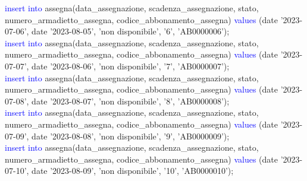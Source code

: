 \documentclass{article}
\begin{document}
\begin{flushleft}
{        \vspace{2mm}
        \hspace*{0.5em}\textcolor{blue}{insert into} assegna(data\_assegnazione, scadenza\_assegnazione, stato, \hspace*{0.5em}numero\_armadietto\_assegna, codice\_abbonamento\_assegna) \textcolor{blue}{values} \hspace*{0.5em}(date \hspace*{0.5em}'2023-07-06', date '2023-08-05', 'non disponibile', '6', 'AB0000006'); \\
        \vspace{2mm}
        \hspace*{0.5em}\textcolor{blue}{insert into} assegna(data\_assegnazione, scadenza\_assegnazione, stato, \hspace*{0.5em}numero\_armadietto\_assegna, codice\_abbonamento\_assegna) \textcolor{blue}{values} \hspace*{0.5em}(date \hspace*{0.5em}'2023-07-07', date '2023-08-06', 'non disponibile', '7', 'AB0000007'); \\
        \vspace{2mm}
        \hspace*{0.5em}\textcolor{blue}{insert into} assegna(data\_assegnazione, scadenza\_assegnazione, stato, \hspace*{0.5em}numero\_armadietto\_assegna, codice\_abbonamento\_assegna) \textcolor{blue}{values} \hspace*{0.5em}(date \hspace*{0.5em}'2023-07-08', date '2023-08-07', 'non disponibile', '8', 'AB0000008'); \\
        \vspace{2mm}
        \hspace*{0.5em}\textcolor{blue}{insert into} assegna(data\_assegnazione, scadenza\_assegnazione, stato, \hspace*{0.5em}numero\_armadietto\_assegna, codice\_abbonamento\_assegna) \textcolor{blue}{values} \hspace*{0.5em}(date \hspace*{0.5em}'2023-07-09', date '2023-08-08', 'non disponibile', '9', 'AB0000009'); \\
        \vspace{2mm}
        \hspace*{0.5em}\textcolor{blue}{insert into} assegna(data\_assegnazione, scadenza\_assegnazione, stato, \hspace*{0.5em}numero\_armadietto\_assegna, codice\_abbonamento\_assegna) \textcolor{blue}{values} \hspace*{0.5em}(date \hspace*{0.5em}'2023-07-10', date '2023-08-09', 'non disponibile', '10', 'AB0000010'); \\
}
\end{flushleft}
\end{document}
